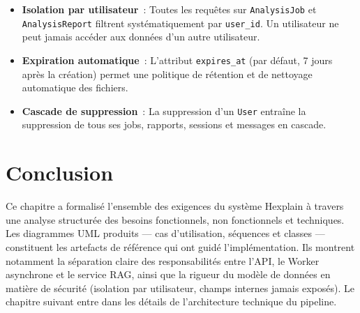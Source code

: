 \begin{itemize}
  \item \textbf{Isolation par utilisateur}~: Toutes les requêtes sur \texttt{AnalysisJob} et \texttt{AnalysisReport} filtrent systématiquement par \texttt{user\_id}. Un utilisateur ne peut jamais accéder aux données d'un autre utilisateur.
  \item \textbf{Expiration automatique}~: L'attribut \texttt{expires\_at} (par défaut, 7 jours après la création) permet une politique de rétention et de nettoyage automatique des fichiers.
  \item \textbf{Cascade de suppression}~: La suppression d'un \texttt{User} entraîne la suppression de tous ses jobs, rapports, sessions et messages en cascade.
\end{itemize}

\section{Conclusion}

Ce chapitre a formalisé l'ensemble des exigences du système Hexplain à travers une analyse structurée des besoins fonctionnels, non fonctionnels et techniques. Les diagrammes UML produits --- cas d'utilisation, séquences et classes --- constituent les artefacts de référence qui ont guidé l'implémentation. Ils montrent notamment la séparation claire des responsabilités entre l'API, le Worker asynchrone et le service RAG, ainsi que la rigueur du modèle de données en matière de sécurité (isolation par utilisateur, champs internes jamais exposés). Le chapitre suivant entre dans les détails de l'architecture technique du pipeline.
